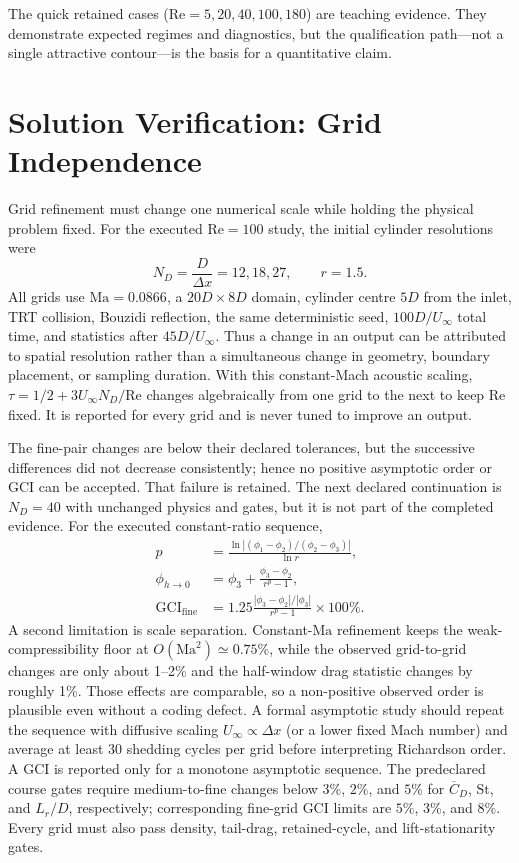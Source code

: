 \documentclass[11pt]{article}
\newcommand{\Rey}{\mathrm{Re}}
\newcommand{\Ma}{\mathrm{Ma}}
\newcommand{\St}{\mathrm{St}}
\begin{document}
\begin{evidencebox}
The quick retained cases ($\Rey=5,20,40,100,180$) are teaching evidence. They demonstrate expected regimes and diagnostics, but the qualification path---not a single attractive contour---is the basis for a quantitative claim.
\end{evidencebox}

\section{Solution Verification: Grid Independence}
Grid refinement must change one numerical scale while holding the physical
problem fixed.  For the executed $\Rey=100$ study, the initial cylinder
resolutions were
\begin{equation}
N_D=\frac{D}{\Delta x}=12,18,27,\qquad r=1.5.
\end{equation}
All grids use $\Ma=0.0866$, a $20D\times8D$ domain, cylinder centre $5D$ from
the inlet, TRT collision, Bouzidi reflection, the same deterministic seed,
$100D/U_\infty$ total time, and statistics after $45D/U_\infty$.  Thus a
change in an output can be attributed to spatial resolution rather than a
simultaneous change in geometry, boundary placement, or sampling duration.
With this constant-Mach acoustic scaling, $\tau=1/2+3U_\infty N_D/\Rey$
changes algebraically from one grid to the next to keep $\Rey$ fixed. It is
reported for every grid and is never tuned to improve an output.

The fine-pair changes are below their declared tolerances, but the
successive differences did not decrease consistently; hence no positive
asymptotic order or GCI can be accepted. That failure is retained. The next
declared continuation is $N_D=40$ with unchanged physics and gates, but it is
not part of the completed evidence. For the executed constant-ratio sequence,
\begin{align}
p&=\frac{\ln\left| (\phi_1-\phi_2)/(\phi_2-\phi_3)\right|}{\ln r},\\
\phi_{h\rightarrow0}&=\phi_3+\frac{\phi_3-\phi_2}{r^p-1},\\
\mathrm{GCI}_{\mathrm{fine}}&=
1.25\frac{|\phi_3-\phi_2|/|\phi_3|}{r^p-1}\times100\%.
\end{align}
A second limitation is scale separation. Constant-$\Ma$ refinement keeps the
weak-compressibility floor at $O(\Ma^2)\simeq0.75\%$, while the observed
grid-to-grid changes are only about 1--2\% and the half-window drag statistic
changes by roughly 1\%. Those effects are comparable, so a non-positive
observed order is plausible even without a coding defect. A formal asymptotic
study should repeat the sequence with diffusive scaling
$U_\infty\propto\Delta x$ (or a lower fixed Mach number) and average at least
30 shedding cycles per grid before interpreting Richardson order.
A GCI is reported only for a monotone asymptotic sequence. The predeclared
course gates require medium-to-fine changes below $3\%$, $2\%$, and $5\%$ for
$\overline C_D$, $\St$, and $L_r/D$, respectively; corresponding fine-grid
GCI limits are $5\%$, $3\%$, and $8\%$. Every grid must also pass density,
tail-drag, retained-cycle, and lift-stationarity gates.
\end{document}
